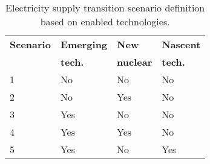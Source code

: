 \begin{table}[H]
\centering
	\caption{Electricity supply transition scenario definition based on enabled technologies.}
	\vspace{0.1in}
	\begin{tabularx}{0.65\textwidth}{p{} p{} p{} p{}}
\hline 
\textbf{Scenario}& \textbf{Emerging} & \textbf{New} & \textbf{Nascent}\\
 & \textbf{tech.} & \textbf{nuclear} & \textbf{tech.}\\

                  \hline
1               &  No       &         No     &     No  \\ 
2               &   No       &      Yes     &     No  \\ 
3               &   Yes     &         No      &     No   \\
4               &   Yes     &      Yes     &     No  \\ 
5               &   Yes     &      No     &     Yes  \\ 
\hline
	\end{tabularx}
\label{scen-table}
\end{table}


